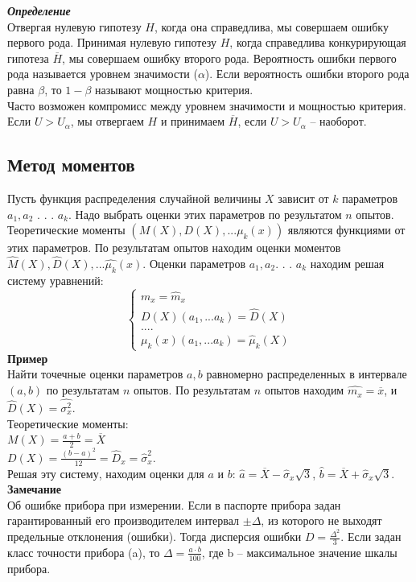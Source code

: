 \documentclass[russian, 12pt, fleqn,x11names]{article}
\begin{document}
\noindent
\textit{\textbf{Определение}}\\
Отвергая нулевую гипотезу $H$, когда она справедлива, мы совершаем ошибку первого рода. Принимая нулевую гипотезу $H$, когда справедлива конкурирующая гипотеза 
 $\overline{H}$, мы совершаем ошибку второго рода. Вероятность ошибки первого рода называется уровнем значимости ($\alpha$). Если вероятность ошибки второго рода равна $\beta$, то $1 - \beta$ называют мощностью критерия.\\
Часто возможен компромисс между уровнем значимости и мощностью критерия. Если $U>U_{\alpha}$, мы отвергаем $H$ и принимаем $\overline{H}$, если $U>U_{\alpha}$ -- наоборот.
\subsection{Метод моментов}
\noindent
Пусть функция распределения случайной величины $X$ зависит от $k$ параметров $a_1, a_2$ . . . $a_k$. Надо выбрать оценки этих параметров по результатом $n$ опытов. Теоретические моменты $(M(X), D(X), ... \mu_k(x))$ являются функциями от этих параметров. По результатам опытов находим оценки моментов  $\hat{M}(X),\hat{D}(X), ... \hat{\mu_k}(x)$.
Оценки параметров $a_1, a_2$. . . $a_k$ находим решая систему уравнений:\\
\begin{equation*} 
 \begin{cases}
  m_x = \hat{m}_x\\
  D(X) (a_1, ... a_k) = \hat{D}(X)\\
  ....\\
 \mu_k(x) (a_1, ... a_k) = \hat{\mu}_k(X)
 \end{cases}
\end{equation*}
\textbf{Пример}\\
Найти точечные оценки параметров $a, b$ равномерно распределенных в интервале $(a, b)$ по результатам $n$ опытов. По результатам $n$ опытов находим $\hat{m_x} = \overline{x}$, и $\hat{D}(X) = \hat{\sigma_x^2}$.\\
Теоретические моменты:\\
$M(X) = \frac{a + b}{2} = \overline{X}$\\
$D(X) = \frac{(b-a)^2}{12} = \hat{D}_x = \hat{\sigma}_x^2$.\\
Решая эту систему, находим оценки для $a$ и $b$: $\hat{a} = \overline{X} - \hat{\sigma}_{x} \sqrt{3}$,  $\hat{b} = \overline{X} + \hat{\sigma}_x \sqrt{3}$.\\
\textbf{Замечание\ } \\
Об ошибке прибора при  измерении. Если в паспорте прибора задан гарантированный его производителем интервал $\pm \Delta$, из которого не выходят предельные отклонения (ошибки).  Тогда дисперсия ошибки $D = \frac{\Delta^2}{3}$. Если задан класс точности прибора (a), то $\Delta = \frac{a \cdot b}{100}$, где b -- максимальное значение шкалы прибора.\\
\end{document}
